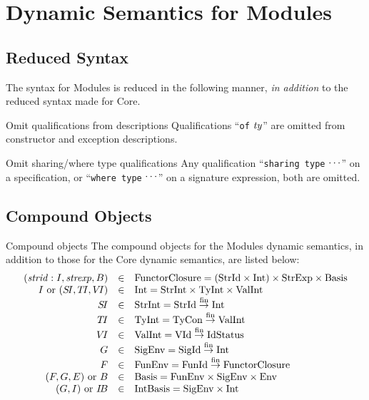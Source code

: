 \chapter{Dynamic Semantics for Modules}\label{ch:dynamic-modules}

\section{Reduced Syntax}

\begin{clause}{}
The syntax for Modules is reduced in the following manner, \emph{in addition}
to the reduced syntax made for Core.
\end{clause}

\begin{clause}{Omit qualifications from descriptions}
Qualifications ``\texttt{of} $\textit{ty\/}$'' are omitted from constructor and
exception descriptions.
\end{clause}

\begin{clause}{Omit sharing/where type qualifications}
Any qualification ``\texttt{sharing type} $\mathinner{{}^{\textstyle .\,.\,.}}$'' on a specification,
or ``\texttt{where type} $\mathinner{{}^{\textstyle .\,.\,.}}$'' on a signature expression, both
are omitted. 
\end{clause}

\section{Compound Objects}\label{sec:dynamic-modules:compound-objects}

\begin{definition}{Compound objects}\label{defn:dynamic-modules:compound-objects}
The compound objects for the Modules dynamic semantics, in addition to
those for the Core dynamic semantics, are listed below:
\begin{equation*}
\begin{array}{rcl}
(\textit{strid\/}:I,\textit{strexp\/},B)
                & \in   & {\rm FunctorClosure} = ({\rm StrId}\times{\rm Int})\times{\rm StrExp}\times{\rm Basis}\\
I\ {\rm or}\ (\mbox{$S\!I$},\mbox{$T\!I$},\mbox{$V\!I$})
                & \in   & {\rm Int} = {\rm StrInt}\times{\rm TyInt}\times{\rm ValInt}\\
        \mbox{$S\!I$}     & \in   & {\rm StrInt} = {\rm StrId}\stackrel{{\rm fin}}{\to}{\rm Int}\\
        \mbox{$T\!I$}     & \in   & {\rm TyInt} =  {\rm TyCon}\stackrel{{\rm fin}}{\to}{\rm ValInt}\\
        \mbox{$V\!I$}     & \in   & {\rm ValInt} = {\rm VId}\stackrel{{\rm fin}}{\to}\hbox{\rm IdStatus}\\ 
        G      & \in   & {\rm SigEnv} = {\rm SigId}\stackrel{{\rm fin}}{\to}{\rm Int}\\
        F      & \in   & {\rm FunEnv} = {\rm FunId}\stackrel{{\rm fin}}{\to}{\rm FunctorClosure}\\
(F,G,E)\ {\rm or}\ B
                & \in   & {\rm Basis} = {\rm FunEnv}\times{\rm SigEnv}\times{\rm Env}\\
(G,I)\ {\rm or}\ \mbox{$I\!B$}
                & \in   & {\rm IntBasis} = {\rm SigEnv}\times{\rm Int}
\end{array}
\end{equation*}
\end{definition}

